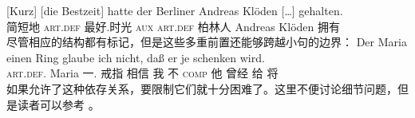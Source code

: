 \ex 
\gll {}[Kurz] [die Bestzeit] hatte der Berliner Andreas Klöden [\ldots] gehalten.\footnotemark\\
	 \spacebr{}简短地 \spacebr{}\textsc{art}.\textsc{def} 最好.时光 \textsc{aux} \textsc{art}.\textsc{def} 柏林人 Andreas Klöden {} 拥有\\
\label{bsp-kurz-die-bestzeit}     
\zl
尽管相应的结构都有标记，但是这些多重前置还能够跨越小句的边界：
\ea 
\gll Der        Maria einen    Ring glaube  ich nicht, daß  er je   schenken wird.\footnotemark\\
     \textsc{art}.\textsc{def}.\dat{} Maria 一.\acc{} 戒指 相信 我   不    \textsc{comp} 他 曾经 给     将\\
\z
如果允许了这种依存关系，要限制它们就十分困难了。这里不便讨论细节问题，但是读者可以参考 。

